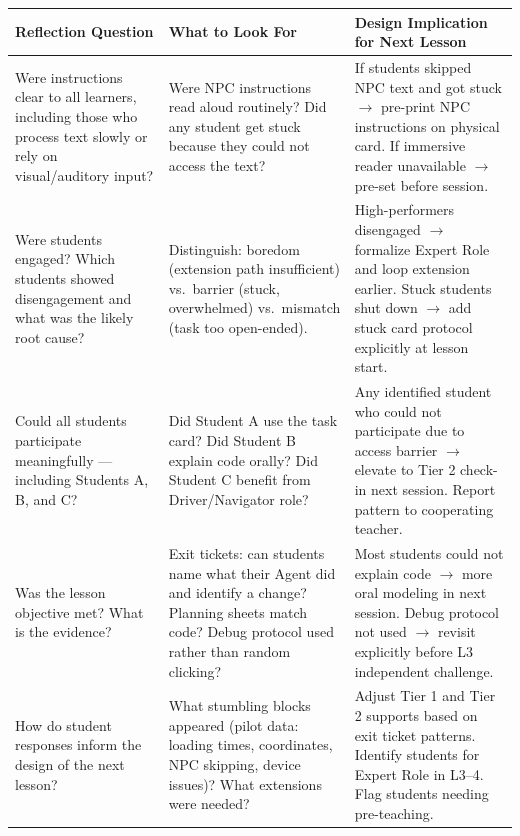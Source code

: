 \documentclass[12pt]{article}
\newcommand{\arow}{\rowcolor{altRow}}
\begin{document}
\begin{tabularx}{\textwidth}{|P{2.0in}|P{2.2in}|L|}
\hline
{}\color{white}\bfseries Reflection Question & \color{white}\bfseries What to Look For & \color{white}\bfseries Design Implication for Next Lesson \\
\hline
Were instructions clear to all learners, including those who process text slowly or rely on visual/auditory input? & Were NPC instructions read aloud routinely? Did any student get stuck because they could not access the text? & If students skipped NPC text and got stuck $\rightarrow$ pre-print NPC instructions on physical card. If immersive reader unavailable $\rightarrow$ pre-set before session. \\
\hline
\arow Were students engaged? Which students showed disengagement and what was the likely root cause? & Distinguish: boredom (extension path insufficient) vs.\ barrier (stuck, overwhelmed) vs.\ mismatch (task too open-ended). & High-performers disengaged $\rightarrow$ formalize Expert Role and loop extension earlier. Stuck students shut down $\rightarrow$ add stuck card protocol explicitly at lesson start. \\
\hline
Could all students participate meaningfully --- including Students A, B, and C? & Did Student A use the task card? Did Student B explain code orally? Did Student C benefit from Driver/Navigator role? & Any identified student who could not participate due to access barrier $\rightarrow$ elevate to Tier 2 check-in next session. Report pattern to cooperating teacher. \\
\hline
\arow Was the lesson objective met? What is the evidence? & Exit tickets: can students name what their Agent did and identify a change? Planning sheets match code? Debug protocol used rather than random clicking? & Most students could not explain code $\rightarrow$ more oral modeling in next session. Debug protocol not used $\rightarrow$ revisit explicitly before L3 independent challenge. \\
\hline
How do student responses inform the design of the next lesson? & What stumbling blocks appeared (pilot data: loading times, coordinates, NPC skipping, device issues)? What extensions were needed? & Adjust Tier 1 and Tier 2 supports based on exit ticket patterns. Identify students for Expert Role in L3--4. Flag students needing pre-teaching. \\
\hline
\end{tabularx}

\clearpage
\end{document}
